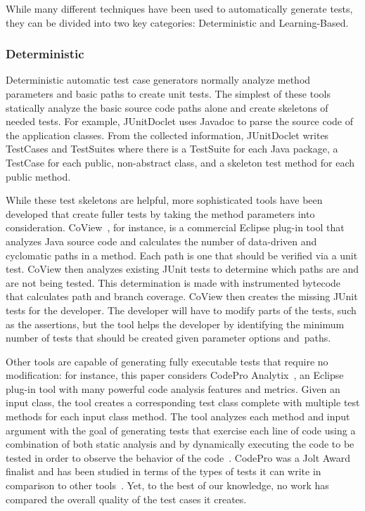 While many different techniques have been used to automatically generate tests, they can be divided into two key categories: Deterministic and Learning-Based.

\subsubsection{Deterministic}

Deterministic automatic test case generators normally analyze method parameters and basic paths to create unit tests.  The simplest of these tools statically analyze the basic source code paths alone and create skeletons of  needed tests.  For example, JUnitDoclet \cite{JUnitDoclet} uses Javadoc to parse the source code of the application classes. From the collected information, JUnitDoclet writes TestCases and TestSuites where there is a TestSuite for each Java package, a TestCase for each public, non-abstract class, and a skeleton test method for each public method. %


While these test skeletons are helpful, more sophisticated tools have been developed that create fuller tests by taking the method parameters into consideration. CoView~\cite{CoView}, for instance, is a commercial Eclipse plug-in tool that analyzes Java source code and calculates the number of data-driven and cyclomatic paths in a method. Each path is one that should be verified via a unit test. CoView then analyzes existing JUnit tests to determine which paths are and are not being tested. This determination is made with instrumented bytecode that calculates path and branch coverage. CoView then creates the missing JUnit tests for the developer. The developer will have to modify parts of the tests, such as the assertions, but the tool helps the developer by identifying the minimum number of tests that should be created given parameter options \mbox{and paths}.

Other tools are capable of generating fully executable tests that require no modification: for instance, this paper
considers CodePro Analytix~\cite{CodePro1}, an Eclipse plug-in tool with many powerful code analysis features and
metrics.  Given an input class, the tool creates a corresponding test class complete with multiple test methods for each
input class method. The tool analyzes each method and input argument with the goal of generating tests that exercise
each line of code using a combination of both static analysis and by dynamically executing the code to be tested in
order to observe the behavior of the code~\cite{CodePro2}.  CodePro was a Jolt Award finalist and has been studied in
terms of the types of tests it can write in comparison to other tools~\cite{xie2009}.  Yet, to the best of our
knowledge, no work has compared the overall quality of the test cases it creates.

